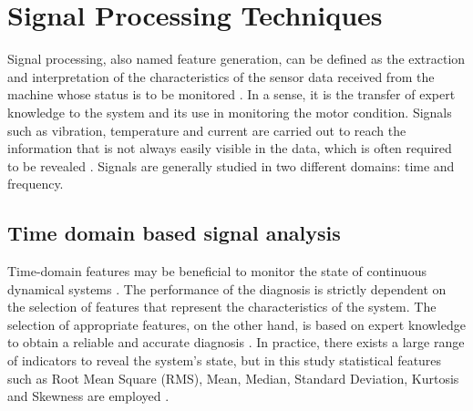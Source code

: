 

\section{Signal Processing Techniques}

Signal processing, also named feature generation, can be defined as the extraction and interpretation of the characteristics of the sensor data received from the machine whose status is to be monitored \cite{cernuda2019relevance}. In a sense, it is the transfer of expert knowledge to the system and its use in monitoring the motor condition. Signals such as vibration, temperature and current are carried out to reach the information that is not always easily visible in the data, which is often required to be revealed \cite{bonaldi2012predictive}. Signals are generally studied in two different domains: time and frequency. 

\subsection{Time domain based signal analysis}

Time-domain features may be beneficial to monitor the state of continuous dynamical systems \cite{medjaher2012feature}. The performance of the diagnosis is strictly dependent on the selection of features that represent the characteristics of the system. The selection of appropriate features, on the other hand, is based on expert knowledge to obtain a reliable and accurate diagnosis \cite{soualhi2019health}. In practice, there exists a large range of indicators to reveal the system's state, but in this study statistical features such as Root Mean Square (RMS), Mean, Median, Standard Deviation, Kurtosis and Skewness are employed \cite{shukla2015analysis}.

